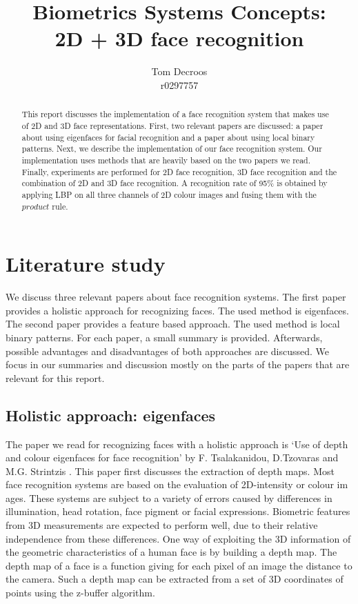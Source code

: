 \documentclass[]{article}
\title{Biometrics Systems Concepts:\\ 2D + 3D face recognition}
\author{Tom Decroos\\r0297757}
\begin{document}
\maketitle
\begin{abstract}
This report discusses the implementation of a face recognition system that makes use of 2D and 3D face representations. First, two relevant papers are discussed: a paper about using eigenfaces for facial recognition and a paper about using local binary patterns. Next, we describe the implementation of our face recognition system. Our implementation uses methods that are heavily based on the two papers we read. Finally, experiments are performed for 2D face recognition, 3D face recognition and the combination of 2D and 3D face recognition. A recognition rate of 95\% is obtained by applying LBP on all three channels of 2D colour images and fusing them with the $product$ rule.

\end{abstract}

\section{Literature study}
We discuss three relevant papers about face recognition systems. The first paper provides a holistic approach for recognizing faces. The used method is eigenfaces. The second paper provides a feature based approach. The used method is local binary patterns.
For each paper, a small summary is provided. Afterwards, possible advantages and disadvantages of both approaches are discussed. We focus in our summaries and discussion mostly on the parts of the papers that are relevant for this report.

\subsection{Holistic approach: eigenfaces}
The paper we read for recognizing faces with a holistic approach is `Use of depth and colour eigenfaces for face recognition' by F. Tsalakanidou, D.Tzovaras and M.G. Strintzis \cite{tsalakanidou2003use}.
This paper first discusses the extraction of depth maps. Most face recognition systems are based on the evaluation of 2D-intensity or colour im ages. These systems are subject to a variety of errors caused by differences in illumination, head rotation, face pigment or facial expressions. Biometric features from 3D measurements are expected to perform well, due to their relative independence from these differences. One way of exploiting the 3D information of the geometric characteristics of a human face is by building a depth map. The depth map of a face is a function giving for each pixel of an image the distance to the camera. Such a depth map can be extracted from a set of 3D coordinates of points using the z-buffer algorithm.
\end{document}
